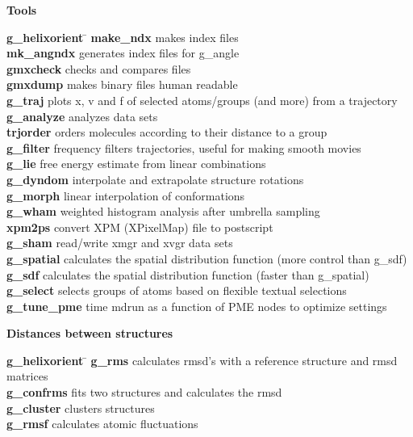 \begin{description}
\item {\large\bf Tools}
\vspace{-2ex}\begin{tabbing}
{\bf g\_helixorient} \= \kill
{\bf make\_ndx} \> makes index files \\
{\bf mk\_angndx} \> generates index files for g\_angle \\
{\bf gmxcheck} \> checks and compares files \\
{\bf gmxdump} \> makes binary files human readable \\
{\bf g\_traj} \> plots x, v and f of selected atoms/groups (and more) from a trajectory \\
{\bf g\_analyze} \> analyzes data sets \\
{\bf trjorder} \> orders molecules according to their distance to a group \\
{\bf g\_filter} \> frequency filters trajectories, useful for making smooth movies \\
{\bf g\_lie} \> free energy estimate from linear combinations \\
{\bf g\_dyndom} \> interpolate and extrapolate structure rotations \\
{\bf g\_morph} \> linear interpolation of conformations  \\
{\bf g\_wham} \> weighted histogram analysis after umbrella sampling \\
{\bf xpm2ps} \> convert XPM (XPixelMap) file to postscript \\
{\bf g\_sham} \> read/write xmgr and xvgr data sets \\
{\bf g\_spatial} \> calculates the spatial distribution function (more control than g\_sdf) \\
{\bf g\_sdf} \> calculates the spatial distribution function (faster than g\_spatial) \\
{\bf g\_select} \> selects groups of atoms based on flexible textual selections \\
{\bf g\_tune\_pme} \> time mdrun as a function of PME nodes to optimize settings \\
\end{tabbing}\vspace{-2ex}

\item {\large\bf Distances between structures}
\vspace{-2ex}\begin{tabbing}
{\bf g\_helixorient} \= \kill
{\bf g\_rms} \> calculates rmsd's with a reference structure and rmsd matrices \\
{\bf g\_confrms} \> fits two structures and calculates the rmsd  \\
{\bf g\_cluster} \> clusters structures \\
{\bf g\_rmsf} \> calculates atomic fluctuations \\
\end{tabbing}\vspace{-2ex}


\end{description}
